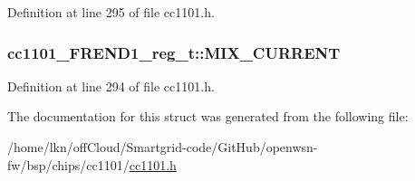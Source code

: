 Definition at line 295 of file cc1101.\+h.

\subsubsection[{\texorpdfstring{M\+I\+X\+\_\+\+C\+U\+R\+R\+E\+NT}{MIX_CURRENT}}]{ cc1101\+\_\+\+F\+R\+E\+N\+D1\+\_\+reg\+\_\+t\+::\+M\+I\+X\+\_\+\+C\+U\+R\+R\+E\+NT}\hypertarget{structcc1101___f_r_e_n_d1__reg__t_a0694bfcb86046b21285840f5adb10c8d}{}\label{structcc1101___f_r_e_n_d1__reg__t_a0694bfcb86046b21285840f5adb10c8d}


Definition at line 294 of file cc1101.\+h.



The documentation for this struct was generated from the following file\+:\begin{DoxyCompactItemize}
\item 
/home/lkn/off\+Cloud/\+Smartgrid-\/code/\+Git\+Hub/openwsn-\/fw/bsp/chips/cc1101/\hyperlink{cc1101_8h}{cc1101.\+h}\end{DoxyCompactItemize}
